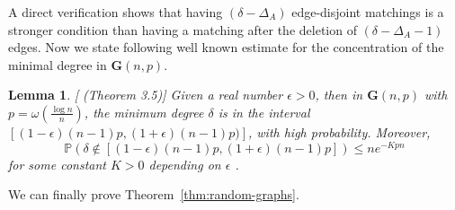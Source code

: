 \documentclass[12pt,UKenglish]{amsart}
\theoremstyle{plain}
\newtheorem{lemma}[thm]{Lemma}
\theoremstyle{definition}
\theoremstyle{remark}
\begin{document}
A direct verification shows that having $(\delta-\Delta_A)$ edge-disjoint matchings is a stronger condition than having a matching after the deletion of $(\delta-\Delta_A-1)$ edges.
Now we state following well known estimate for the concentration of the minimal degree in $\textbf{G}(n,p)$.
 \begin{lemma}\label{lem:min-degree}[\cite{FriezeKaronski2015} (Theorem 3.5)]
  Given a real number $\epsilon>0$, then in $\mathbf{G}(n,p)$ with $p=\omega(\frac{\log n}{n})$, the minimum degree $\delta$ is in the interval $[(1-\epsilon)(n-1)p,(1+\epsilon)(n-1)p)]$, with high probability.
 Moreover, \[\mathbb{P}(\delta\notin[(1-\epsilon)(n-1)p,(1+\epsilon)(n-1)p])\le ne^{-Kpn}\] for some constant $K>0$ depending on $\epsilon$ .
\end{lemma}
We can finally prove Theorem~\ref{thm:random-graphs}.
\end{document}
